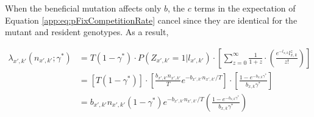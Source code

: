 \documentclass[9pt,twocolumn,twoside,lineno]{gsajnl}
\begin{document}
When the beneficial mutation affects only $b$, the $c$ terms in the expectation of Equation \eqref{app:eq:pFixCompetitionRate} cancel since they are identical for the mutant and resident genotypes. As a result,

\begin{align}
\lambda_{x',k'}(n_{x',k'};\gamma^*)&=T(1-\gamma^*) \cdot P(Z_{x',k'}=1|l_{x',k'}) \cdot \left[ \sum_{z=0}^\infty \frac{1}{1+z} \cdot \left(\frac{e^{-l_{x,k}}l_{x,k}^z}{z!}\right) \right]\nonumber\\[7pt]
&=[ T(1-\gamma^*) ]\cdot \left [ \frac{b_{x',k'}n_{x',k'}}{T}e^{-b_{x',k'}n_{x',k'}/T} \right] \cdot \left[ \frac{1-e^{-b_{x,k}\gamma^*}}{b_{x,k}\gamma^*} \right]\nonumber\\[7pt]
&=b_{x',k'}n_{x',k'} (1-\gamma^*) e^{-b_{x',k'} n_{x',k'}/T} \left( \frac{1-e^{-b_{x,k}\gamma^*}}{b_{x,k}\gamma^*} \right) \label{app:eq:bCompRate}
\end{align}
\end{document}
